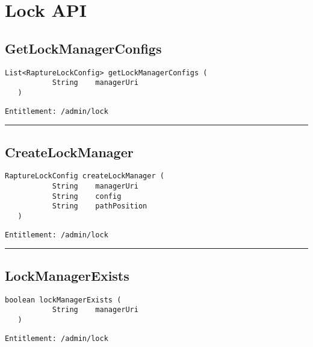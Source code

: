 \chapter{Lock API}

\section{GetLockManagerConfigs}
\label{Api:GetLockManagerConfigs}
\begin{lstlisting}[style=nonumbers]
   List<RaptureLockConfig> getLockManagerConfigs (
           String    managerUri
   )
\end{lstlisting}
\begin{Verbatim}[formatcom=\color{Maroon}]
  Entitlement: /admin/lock
\end{Verbatim}



\rule{12cm}{2pt}
\section{CreateLockManager}
\label{Api:CreateLockManager}
\begin{lstlisting}[style=nonumbers]
   RaptureLockConfig createLockManager (
           String    managerUri
           String    config
           String    pathPosition
   )
\end{lstlisting}
\begin{Verbatim}[formatcom=\color{Maroon}]
  Entitlement: /admin/lock
\end{Verbatim}



\rule{12cm}{2pt}
\section{LockManagerExists}
\label{Api:LockManagerExists}
\begin{lstlisting}[style=nonumbers]
   boolean lockManagerExists (
           String    managerUri
   )
\end{lstlisting}
\begin{Verbatim}[formatcom=\color{Maroon}]
  Entitlement: /admin/lock
\end{Verbatim}




